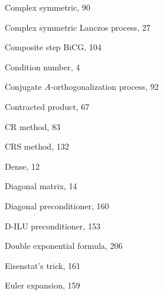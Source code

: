 \begin{description}
{Complex symmetric}, {90}\par

{Complex symmetric Lanczos process}, {27}\par

{Composite step BiCG}, {104}\par

{Condition number}, {4}\par

{Conjugate $A$-orthogonalization process}, {92}\par

{Contracted product}, {67}\par

{CR method}, {83}\par

{CRS method}, {132}\par

\item[D]
{Dense}, {12}\par

{Diagonal matrix}, {14}\par

{Diagonal preconditioner}, {160}\par

{D-ILU preconditioner}, {153}\par

{Double exponential formula}, {206}\par

\item[E]
{Eisenstat’s trick}, {161}\par

{Euler expansion}, {159}\par


\end{description}
